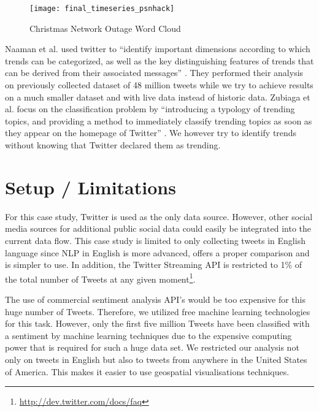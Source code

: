 \begin{figure}[H]
  \centering
        \texttt{[image: final\_timeseries\_psnhack]}
  \caption[Christmas Network Outage Word Cloud]{Christmas Network Outage Word Cloud}
  \label{fig:christmas-network-outage-word-cloud}
  \vspace{-1.3em}
\end{figure}

Naaman et al. used twitter to \enquote{identify important dimensions according to which trends can be categorized, as well as the key distinguishing features of trends that can be derived from their associated messages} \cite{naaman2011characterizing}. They performed their analysis on previously collected dataset of 48 million tweets while we try to achieve results on a much smaller dataset and with live data instead of historic data. Zubiaga et al. focus on the classification problem by \enquote{introducing a typology of trending topics, and providing a method to immediately classify trending topics as soon as they  appear  on  the  homepage  of  Twitter} \cite{zubiaga2011classifications}. We however try to identify trends without knowing that Twitter declared them as trending.



\section{Setup / Limitations}
\label{sec:setup}
For this case study, Twitter is used as the only data source. However, other social media sources for additional public social data could easily be integrated into the current data flow. This case study is limited to only collecting tweets in English language since NLP in English is more advanced, offers a proper comparison and is simpler to use. In addition, the Twitter Streaming API is restricted to 1\% of the total number of Tweets at any given moment\footnote{\url{http://dev.twitter.com/docs/faq} \accessednote}.

The use of commercial sentiment analysis API's would be too expensive for this huge number of Tweets. Therefore, we utilized free machine learning technologies for this task. However, only the first five million Tweets have been classified with a sentiment by machine learning techniques due to the expensive computing power that is required for such a huge data set. We restricted our analysis not only on tweets in English but also to tweets from anywhere in the United States of America. This makes it easier to use geospatial visualisations techniques.


